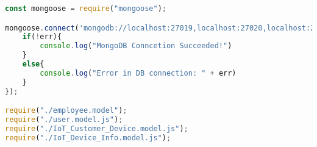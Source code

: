 \begin{lstlisting}[language=JavaScript, caption=Showcase of Mongoose connection to database]
const mongoose = require("mongoose");

mongoose.connect('mongodb://localhost:27019,localhost:27020,localhost:27021/initialDB', {useNewUrlParser: true}, (err) => {
    if(!err){
        console.log("MongoDB Conncetion Succeeded!")
    }
    else{
        console.log("Error in DB connection: " + err)
    }
});

require("./employee.model");
require("./user.model.js");
require("./IoT_Customer_Device.model.js");
require("./IoT_Device_Info.model.js");
\end{lstlisting}